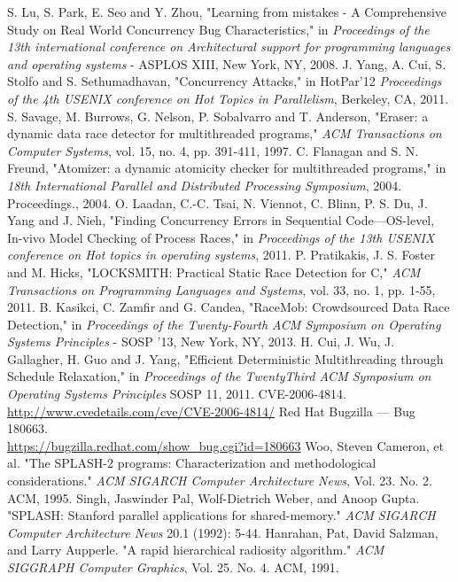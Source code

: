 \documentclass[12pt,conference]{IEEEtran}
\begin{document}

\begin{thebibliography}{13}
S. Lu, S. Park, E. Seo and Y. Zhou, "Learning from mistakes - A Comprehensive Study on Real World Concurrency Bug Characteristics," in \emph{Proceedings of the 13th international conference on Architectural support for programming languages and operating systems} - ASPLOS XIII, New York, NY, 2008.
J. Yang, A. Cui, S. Stolfo and S. Sethumadhavan, "Concurrency Attacks," in HotPar'12 \emph{Proceedings of the 4th USENIX conference on Hot Topics in Parallelism}, Berkeley, CA, 2011.
S. Savage, M. Burrows, G. Nelson, P. Sobalvarro and T. Anderson, "Eraser: a dynamic data race detector for multithreaded programs," \emph{ACM Transactions on Computer Systems}, vol. 15, no. 4, pp. 391-411, 1997.
C. Flanagan and S. N. Freund, "Atomizer: a dynamic atomicity checker for multithreaded programs," in \emph{18th International Parallel and Distributed Processing Symposium}, 2004. Proceedings., 2004.
O. Laadan, C.-C. Tsai, N. Viennot, C. Blinn, P. S. Du, J. Yang and J. Nieh, "Finding Concurrency Errors in Sequential Code—OS-level, In-vivo Model Checking of Process Races," in \emph{Proceedings of the 13th USENIX conference on Hot topics in operating systems}, 2011.
P. Pratikakis, J. S. Foster and M. Hicks, "LOCKSMITH: Practical Static Race Detection for C," \emph{ACM Transactions on Programming Languages and Systems}, vol. 33, no. 1, pp. 1-55, 2011.
B. Kasikci, C. Zamfir and G. Candea, "RaceMob: Crowdsourced Data Race Detection," in \emph{Proceedings of the Twenty-Fourth ACM Symposium on Operating Systems Principles} - SOSP '13, New York, NY, 2013.
H. Cui, J. Wu, J. Gallagher, H. Guo and J. Yang, "Efficient Deterministic Multithreading through Schedule Relaxation," in \emph{Proceedings of the TwentyThird ACM Symposium on Operating Systems Principles} SOSP 11, 2011.
CVE-2006-4814. \url{http://www.cvedetails.com/cve/CVE-2006-4814/}
Red Hat Bugzilla --- Bug 180663.\\\url{https://bugzilla.redhat.com/show_bug.cgi?id=180663}
Woo, Steven Cameron, et al. "The SPLASH-2 programs: Characterization and methodological considerations." \emph{ACM SIGARCH Computer Architecture News}, Vol. 23. No. 2. ACM, 1995.
Singh, Jaswinder Pal, Wolf-Dietrich Weber, and Anoop Gupta. "SPLASH: Stanford parallel applications for shared-memory." \emph{ACM SIGARCH Computer Architecture News} 20.1 (1992): 5-44.
Hanrahan, Pat, David Salzman, and Larry Aupperle. "A rapid hierarchical radiosity algorithm." \emph{ACM SIGGRAPH Computer Graphics}, Vol. 25. No. 4. ACM, 1991.
\end{thebibliography}
\end{document}
